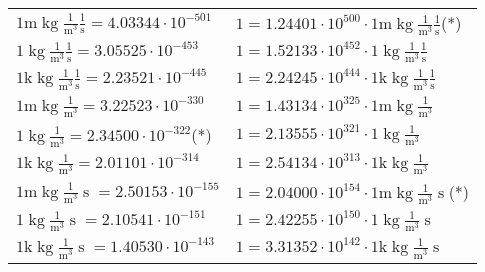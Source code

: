 \begin{center}
\begin{longtable}{l l}
{\color{gray}$1 \bm{\mathrm{ m}}\operatorname{kg}\frac1{\operatorname{m}^3}\frac1{\operatorname{s}}{}{} = 4.03344\cdot10^{-501} $}   & {\color{gray}$ 1 = 1.24401\cdot10^{500} \cdot 1 \bm{\mathrm{ m}}\operatorname{kg}\frac1{\operatorname{m}^3}\frac1{\operatorname{s}}{}{}$}\quad(*)\\
{\color{black}$1 \bm{\mathrm{ }}\operatorname{kg}\frac1{\operatorname{m}^3}\frac1{\operatorname{s}}{}{} = 3.05525\cdot10^{-453} $}   & {\color{black}$ 1 = 1.52133\cdot10^{452} \cdot 1 \bm{\mathrm{ }}\operatorname{kg}\frac1{\operatorname{m}^3}\frac1{\operatorname{s}}{}{}$}  \\
{\color{gray}$1 \bm{\mathrm{ k}}\operatorname{kg}\frac1{\operatorname{m}^3}\frac1{\operatorname{s}}{}{} = 2.23521\cdot10^{-445} $}   & {\color{gray}$ 1 = 2.24245\cdot10^{444} \cdot 1 \bm{\mathrm{ k}}\operatorname{kg}\frac1{\operatorname{m}^3}\frac1{\operatorname{s}}{}{}$}  \\
{\color{gray}$1 \bm{\mathrm{ m}}\operatorname{kg}\frac1{\operatorname{m}^3}{}{}{} = 3.22523\cdot10^{-330} $}   & {\color{gray}$ 1 = 1.43134\cdot10^{325} \cdot 1 \bm{\mathrm{ m}}\operatorname{kg}\frac1{\operatorname{m}^3}{}{}{}$}  \\
{\color{black}$1 \bm{\mathrm{ }}\operatorname{kg}\frac1{\operatorname{m}^3}{}{}{} = 2.34500\cdot10^{-322} $}\quad(*) & {\color{black}$ 1 = 2.13555\cdot10^{321} \cdot 1 \bm{\mathrm{ }}\operatorname{kg}\frac1{\operatorname{m}^3}{}{}{}$}  \\
{\color{gray}$1 \bm{\mathrm{ k}}\operatorname{kg}\frac1{\operatorname{m}^3}{}{}{} = 2.01101\cdot10^{-314} $}   & {\color{gray}$ 1 = 2.54134\cdot10^{313} \cdot 1 \bm{\mathrm{ k}}\operatorname{kg}\frac1{\operatorname{m}^3}{}{}{}$}  \\
{\color{gray}$1 \bm{\mathrm{ m}}\operatorname{kg}\frac1{\operatorname{m}^3}{\operatorname{s}}{}{} = 2.50153\cdot10^{-155} $}   & {\color{gray}$ 1 = 2.04000\cdot10^{154} \cdot 1 \bm{\mathrm{ m}}\operatorname{kg}\frac1{\operatorname{m}^3}{\operatorname{s}}{}{}$}\quad(*)\\
{\color{black}$1 \bm{\mathrm{ }}\operatorname{kg}\frac1{\operatorname{m}^3}{\operatorname{s}}{}{} = 2.10541\cdot10^{-151} $}   & {\color{black}$ 1 = 2.42255\cdot10^{150} \cdot 1 \bm{\mathrm{ }}\operatorname{kg}\frac1{\operatorname{m}^3}{\operatorname{s}}{}{}$}  \\
{\color{gray}$1 \bm{\mathrm{ k}}\operatorname{kg}\frac1{\operatorname{m}^3}{\operatorname{s}}{}{} = 1.40530\cdot10^{-143} $}   & {\color{gray}$ 1 = 3.31352\cdot10^{142} \cdot 1 \bm{\mathrm{ k}}\operatorname{kg}\frac1{\operatorname{m}^3}{\operatorname{s}}{}{}$}  \\

\end{longtable}
\end{center}
